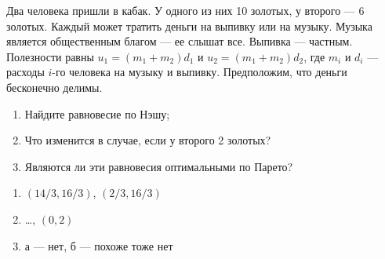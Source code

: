 \begin{problem}
 Два человека пришли в кабак. У одного из них 10 золотых, у второго
--- 6 золотых. Каждый может тратить деньги на выпивку или на музыку.
Музыка является общественным благом --- ее слышат все. Выпивка ---
частным. Полезности равны $u_{1}=(m_{1}+m_{2})d_{1}$ и
$u_{2}=(m_{1}+m_{2})d_{2}$, где $m_{i}$ и $d_{i}$ --- расходы $i$-го
человека на музыку и выпивку. Предположим, что деньги бесконечно
делимы. \par
\begin{enumerate}
\item Найдите равновесие по Нэшу; \par
\item Что изменится в случае, если у второго 2 золотых? \par
\item  Являются ли эти равновесия оптимальными по Парето?
\end{enumerate}


\begin{sol}
\begin{enumerate}
\item $(14/3,16/3)$, $(2/3,16/3)$ \par
\item \ldots, $(0,2)$ \par
\item  а --- нет, б --- похоже тоже нет
\end{enumerate}
\end{sol}
\end{problem}



